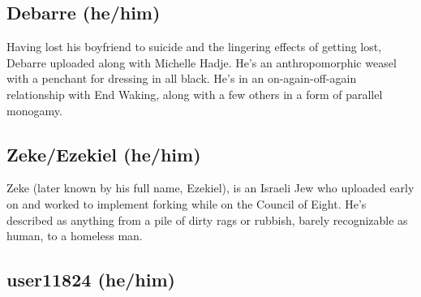 \subsection{Debarre (he/him)}

Having lost his boyfriend to suicide and the lingering effects of getting lost, Debarre uploaded along with Michelle Hadje. He's an anthropomorphic weasel with a penchant for dressing in all black. He's in an on-again-off-again relationship with End Waking, along with a few others in a form of parallel monogamy.

\begin{comment}
\emph{Appears in:}

\begin{itemize}
\tightlist
\item
  \href{https://qoheleth.post-self.ink}{\emph{Qoheleth}}
\item
  \href{https://toledot.post-self.ink}{\emph{Toledot}}
\item
  \href{https://neviim.post-self.ink}{\emph{Nevi'im}}
\item
  \href{https://mitzvot.post-self.ink}{\emph{Mitzvot} and ``Selected Letters''}
\end{itemize}
\end{comment}

\subsection{Zeke/Ezekiel (he/him)}

Zeke (later known by his full name, Ezekiel), is an Israeli Jew who uploaded early on and worked to implement forking while on the Council of Eight. He's described as anything from a pile of dirty rags or rubbish, barely recognizable as human, to a homeless man.

\begin{comment}
\emph{Appears in:}

\begin{itemize}
\tightlist
\item
  \href{https://toledot.post-self.ink}{\emph{Toledot}}
\item
  \href{https://neviim.post-self.ink}{\emph{Nevi'im}} (mentioned)
\item
  \href{https://mitzvot.post-self.ink}{\emph{Mitzvot}} (mentioned)
\end{itemize}
\end{comment}

\subsection{user11824 (he/him)}

